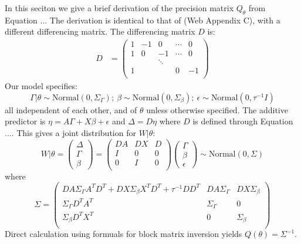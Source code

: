 \documentclass[]{article}
\begin{document}
In this seciton we give a brief derivation of the precision matrix $Q_{\theta}$ from Equation ... The derivation is identical to that of \citet{casecross} (Web Appendix C), with a different differencing matrix. The differencing matrix $D$ is:
\begin{equation}\begin{aligned}\label{eqn:D2}
D &= \begin{pmatrix}
1 & -1 & 0 & \cdots & 0 \\
1 & 0 & -1 & \cdots & 0 \\
  &    & \ddots &   &   \\
1 &    &       & 0 & -1 \\
\end{pmatrix}
\end{aligned}\end{equation}
Our model specifies:
\begin{equation*}
\Gamma|\theta \sim \text{Normal}\left( 0,\Sigma_{\Gamma}\right); \ \beta \sim \text{Normal}\left( 0,\Sigma_{\beta}\right); \ \epsilon \sim \text{Normal}\left( 0,\tau^{-1}I\right)
\end{equation*}
all independent of each other, and of $\theta$ unless otherwise specified. The additive predictor is $\eta = A\Gamma + X\beta + \epsilon$ and $\Delta = D\eta$ where $D$ is defined through Equation .... This gives a joint distribution for $W|\theta$:
\begin{equation*}
W|\theta = \begin{pmatrix} \Delta \\ \Gamma \\\beta \end{pmatrix} = \begin{pmatrix} DA & DX & D \\ I & 0 & 0 \\ 0 & I & 0 \\ \end{pmatrix}\begin{pmatrix}\Gamma \\ \beta \\ \epsilon \end{pmatrix} 
\sim \text{Normal}\left( 0,\Sigma\right)
\end{equation*}
where
\begin{equation*}
\Sigma = \begin{pmatrix}
DA\Sigma_{\Gamma}A^{T}D^{T} + DX\Sigma_{\beta}X^{T}D^{T} + \tau^{-1}DD^{T} & DA\Sigma_{\Gamma} & DX\Sigma_{\beta} \\
\Sigma_{\Gamma}D^{T}A^{T} & \Sigma_{\Gamma} & 0 \\
\Sigma_{\beta}D^{T}X^{T} & 0 & \Sigma_{\beta} \\
\end{pmatrix}
\end{equation*}
Direct calculation using formuals for block matrix inversion yields $Q(\theta) = \Sigma^{-1}$.
\end{document}
